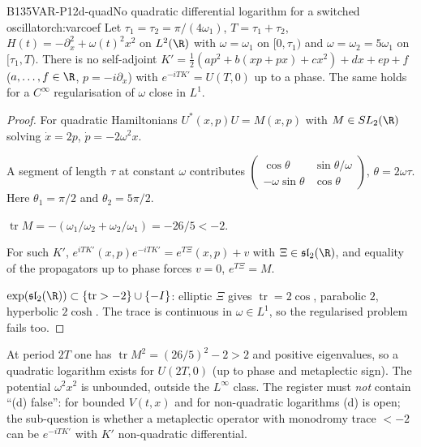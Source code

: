 \begin{dimcard}{B135}{VAR-P12d-quad}{No quadratic differential logarithm for a switched oscillator}{\pw}{ch:varcoef}
Let $\tau_1=\tau_2=\pi/(4\omega_1)$, $T=\tau_1+\tau_2$, $H(t)=-\partial_x^2+\omega(t)^2x^2$ on $L^2(\R)$ with $\omega=\omega_1$ on $[0,\tau_1)$ and $\omega=\omega_2=5\omega_1$ on $[\tau_1,T)$. There is no self-adjoint $K'=\frac12(ap^2+b(xp+px)+cx^2)+dx+ep+f$ ($a,\dots,f\in\R$, $p=-i\partial_x$) with $e^{-iTK'}=U(T,0)$ up to a phase. The same holds for a $C^\infty$ regularisation of $\omega$ close in $L^1$.
\end{dimcard}

\begin{proof}
For quadratic Hamiltonians $U^*(x,p)U=M(x,p)$ with $M\in SL_2(\R)$ solving $\dot x=2p$, $\dot p=-2\omega^2x$.

A segment of length $\tau$ at constant $\omega$ contributes $\begin{pmatrix}\cos\theta&\sin\theta/\omega\\-\omega\sin\theta&\cos\theta\end{pmatrix}$, $\theta=2\omega\tau$. Here $\theta_1=\pi/2$ and $\theta_2=5\pi/2$.

$\operatorname{tr}M=-(\omega_1/\omega_2+\omega_2/\omega_1)=-26/5<-2$.

For such $K'$, $e^{iTK'}(x,p)e^{-iTK'}=e^{T\Xi}(x,p)+v$ with $\Xi\in\mathfrak{sl}_2(\R)$, and equality of the propagators up to phase forces $v=0$, $e^{T\Xi}=M$.

$\exp(\mathfrak{sl}_2(\R))\subset\{\operatorname{tr}>-2\}\cup\{-I\}$: elliptic $\Xi$ gives $\operatorname{tr}=2\cos$, parabolic $2$, hyperbolic $2\cosh$. The trace is continuous in $\omega\in L^1$, so the regularised problem fails too.

\end{proof}

\begin{caution}[title=What it does not say]
At period $2T$ one has $\operatorname{tr}M^2=(26/5)^2-2>2$ and positive eigenvalues, so a quadratic logarithm exists for $U(2T,0)$ (up to phase and metaplectic sign). The potential $\omega^2x^2$ is unbounded, outside the $L^\infty$ class. The register must \emph{not} contain ``(d) false'': for bounded $V(t,x)$ and for non-quadratic logarithms (d) is open; the sub-question is whether a metaplectic operator with monodromy trace $<-2$ can be $e^{-iTK'}$ with $K'$ non-quadratic differential.
\end{caution}

